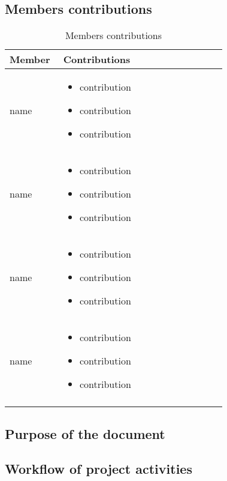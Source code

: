 \subsection{Members contributions}
\begin{longtable}
    {|m{0.23\linewidth}|m{0.7\linewidth}|}
            \hline
            \textbf{Member} & \textbf{Contributions}\\
            \hline
            \endhead
                name & \begin{itemize}
                    \item contribution
                    \item contribution
                    \item contribution
                \end{itemize} \\
            \hline
                 name & \begin{itemize}
                    \item contribution
                    \item contribution
                    \item contribution
                \end{itemize} \\
            \hline
                 name & \begin{itemize}
                    \item contribution
                    \item contribution
                    \item contribution
                \end{itemize} \\
            \hline
                name & \begin{itemize}
                    \item contribution
                    \item contribution
                    \item contribution
                \end{itemize} \\
            \hline
            \caption{Members contributions}
            \label{table:mem_contributions}
\end{longtable}

\subsection{Purpose of the document}


\subsection{Workflow of project activities}

